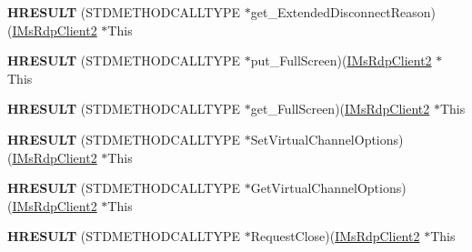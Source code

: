 \begin{DoxyCompactItemize}
\item 
\mbox{\label{struct_m_s_t_s_c_lib_1_1_i_ms_rdp_client2_vtbl_ac2c260edccf813aea2d687dd6d63a8a1}} 
{\bfseries H\+R\+E\+S\+U\+LT} (S\+T\+D\+M\+E\+T\+H\+O\+D\+C\+A\+L\+L\+T\+Y\+PE $\ast$get\+\_\+\+Extended\+Disconnect\+Reason)(\hyperlink{interface_m_s_t_s_c_lib_1_1_i_ms_rdp_client2}{I\+Ms\+Rdp\+Client2} $\ast$This
\item 
\mbox{\label{struct_m_s_t_s_c_lib_1_1_i_ms_rdp_client2_vtbl_abae850607aabb17817a789c0c0852520}} 
{\bfseries H\+R\+E\+S\+U\+LT} (S\+T\+D\+M\+E\+T\+H\+O\+D\+C\+A\+L\+L\+T\+Y\+PE $\ast$put\+\_\+\+Full\+Screen)(\hyperlink{interface_m_s_t_s_c_lib_1_1_i_ms_rdp_client2}{I\+Ms\+Rdp\+Client2} $\ast$This
\item 
\mbox{\label{struct_m_s_t_s_c_lib_1_1_i_ms_rdp_client2_vtbl_ae3f1299babd6491c2bf40b07e704923e}} 
{\bfseries H\+R\+E\+S\+U\+LT} (S\+T\+D\+M\+E\+T\+H\+O\+D\+C\+A\+L\+L\+T\+Y\+PE $\ast$get\+\_\+\+Full\+Screen)(\hyperlink{interface_m_s_t_s_c_lib_1_1_i_ms_rdp_client2}{I\+Ms\+Rdp\+Client2} $\ast$This
\item 
\mbox{\label{struct_m_s_t_s_c_lib_1_1_i_ms_rdp_client2_vtbl_a88bfeeb8824ba8c324d1baef17fa66d7}} 
{\bfseries H\+R\+E\+S\+U\+LT} (S\+T\+D\+M\+E\+T\+H\+O\+D\+C\+A\+L\+L\+T\+Y\+PE $\ast$Set\+Virtual\+Channel\+Options)(\hyperlink{interface_m_s_t_s_c_lib_1_1_i_ms_rdp_client2}{I\+Ms\+Rdp\+Client2} $\ast$This
\item 
\mbox{\label{struct_m_s_t_s_c_lib_1_1_i_ms_rdp_client2_vtbl_a259111fd7a04e5b84a1c0db06dd04c7c}} 
{\bfseries H\+R\+E\+S\+U\+LT} (S\+T\+D\+M\+E\+T\+H\+O\+D\+C\+A\+L\+L\+T\+Y\+PE $\ast$Get\+Virtual\+Channel\+Options)(\hyperlink{interface_m_s_t_s_c_lib_1_1_i_ms_rdp_client2}{I\+Ms\+Rdp\+Client2} $\ast$This
\item 
\mbox{\label{struct_m_s_t_s_c_lib_1_1_i_ms_rdp_client2_vtbl_a69c81edf1233f9b497aac2e846ebfd42}} 
{\bfseries H\+R\+E\+S\+U\+LT} (S\+T\+D\+M\+E\+T\+H\+O\+D\+C\+A\+L\+L\+T\+Y\+PE $\ast$Request\+Close)(\hyperlink{interface_m_s_t_s_c_lib_1_1_i_ms_rdp_client2}{I\+Ms\+Rdp\+Client2} $\ast$This

\end{DoxyCompactItemize}
